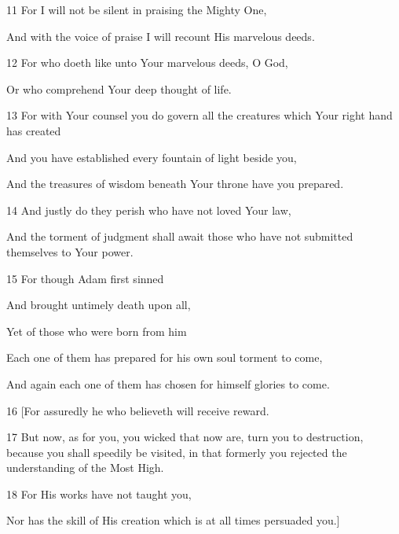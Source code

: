 \par 11 For I will not be silent in praising the Mighty One,

\par And with the voice of praise I will recount His marvelous deeds.

\par 12 For who doeth like unto Your marvelous deeds, O God,

\par Or who comprehend Your deep thought of life.

\par 13 For with Your counsel you do govern all the creatures which Your right hand has created

\par And you have established every fountain of light beside you,

\par And the treasures of wisdom beneath Your throne have you prepared.

\par 14 And justly do they perish who have not loved Your law,

\par And the torment of judgment shall await those who have not submitted themselves to Your power.

\par 15 For though Adam first sinned

\par And brought untimely death upon all,

\par Yet of those who were born from him

\par Each one of them has prepared for his own soul torment to come,

\par And again each one of them has chosen for himself glories to come.

\par 16 [For assuredly he who believeth will receive reward.

\par 17 But now, as for you, you wicked that now are, turn you to destruction, because you shall speedily be visited, in that formerly you rejected the understanding of the Most High.

\par 18 For His works have not taught you,

\par Nor has the skill of His creation which is at all times persuaded you.]

